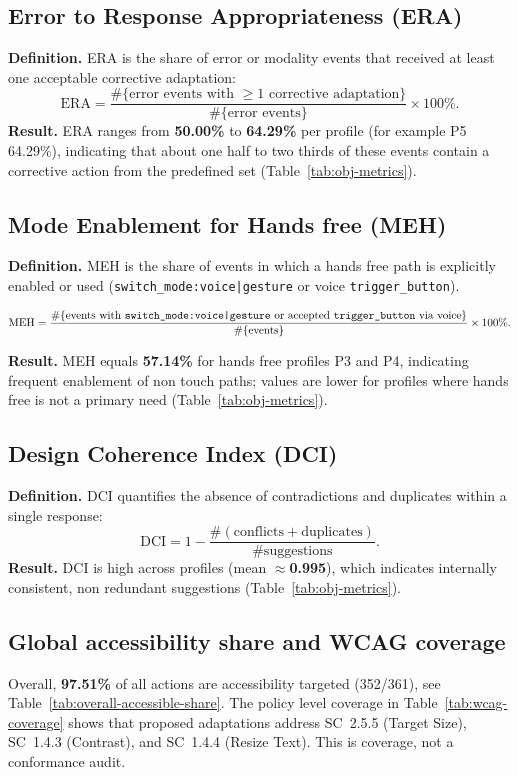 \documentclass[openany]{book}
\begin{document}
\subsection{Error to Response Appropriateness (ERA)}
\textbf{Definition.}
ERA is the share of error or modality events that received at least one acceptable corrective adaptation:
\[
\mathrm{ERA} = \frac{\#\{\text{error events with }\geq 1 \text{ corrective adaptation}\}}{\#\{\text{error events}\}} \times 100\%.
\]
\textbf{Result.}
ERA ranges from \textbf{50.00\%} to \textbf{64.29\%} per profile (for example P5 64.29\%), indicating that about one half to two thirds of these events contain a corrective action from the predefined set (Table~\ref{tab:obj-metrics}).

\subsection{Mode Enablement for Hands free (MEH)}
\textbf{Definition.}
MEH is the share of events in which a hands free path is explicitly enabled or used (\texttt{switch\_mode:voice|gesture} or voice \texttt{trigger\_button}).

\[
\mathrm{MEH} = \frac{\#\{\text{events with \texttt{switch\_mode:voice|gesture} or accepted \texttt{trigger\_button} via voice}\}}{\#\{\text{events}\}} \times 100\%.
\]

\textbf{Result.}
MEH equals \textbf{57.14\%} for hands free profiles P3 and P4, indicating frequent enablement of non touch paths; values are lower for profiles where hands free is not a primary need (Table~\ref{tab:obj-metrics}).

\subsection{Design Coherence Index (DCI)}
\textbf{Definition.}
DCI quantifies the absence of contradictions and duplicates within a single response:
\[
\mathrm{DCI} = 1 - \frac{\#(\text{conflicts}+\text{duplicates})}{\#\text{suggestions}}.
\]
\textbf{Result.}
DCI is high across profiles (mean $\approx$\textbf{0.995}), which indicates internally consistent, non redundant suggestions (Table~\ref{tab:obj-metrics}).

\subsection{Global accessibility share and WCAG coverage}
Overall, \textbf{97.51\%} of all actions are accessibility targeted (352/361), see Table~\ref{tab:overall-accessible-share}. The policy level coverage in Table~\ref{tab:wcag-coverage} shows that proposed adaptations address SC~2.5.5 (Target Size), SC~1.4.3 (Contrast), and SC~1.4.4 (Resize Text). This is coverage, not a conformance audit.
\end{document}
